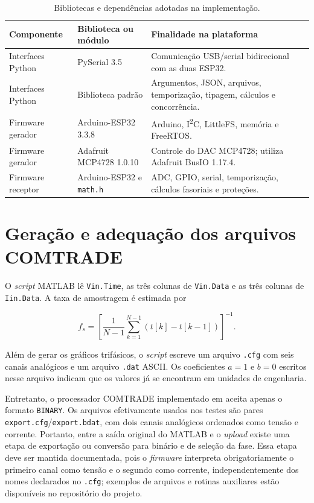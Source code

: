 \begin{table}[H]
  \centering
  \small
  \caption{Bibliotecas e dependências adotadas na implementação.}
  \label{tab:bibliotecas-software}
  \begin{tabular}{p{3.1cm}p{3.5cm}p{6.0cm}}
    \toprule
    Componente & Biblioteca ou módulo & Finalidade na plataforma \\
    \midrule
    Interfaces Python & PySerial 3.5 & Comunicação USB/serial bidirecional com as duas ESP32. \\
    Interfaces Python & Biblioteca padrão & Argumentos, JSON, arquivos, temporização, tipagem, cálculos e concorrência. \\
    Firmware gerador & Arduino-ESP32 3.3.8 & Arduino, I\textsuperscript{2}C, LittleFS, memória e FreeRTOS. \\
    Firmware gerador & Adafruit MCP4728 1.0.10 & Controle do DAC MCP4728; utiliza Adafruit BusIO 1.17.4. \\
    Firmware receptor & Arduino-ESP32 e \texttt{math.h} & ADC, GPIO, serial, temporização, cálculos fasoriais e proteções. \\
    \bottomrule
  \end{tabular}
\end{table}

\section{Geração e adequação dos arquivos COMTRADE}

O \textit{script} MATLAB lê \texttt{Vin.Time}, as três colunas de \texttt{Vin.Data} e as três colunas de \texttt{Iin.Data}. A taxa de amostragem é estimada por

\begin{equation}
  f_s=\left[\frac{1}{N-1}\sum_{k=1}^{N-1}\left(t[k]-t[k-1]\right)\right]^{-1}.
\end{equation}

Além de gerar os gráficos trifásicos, o \textit{script} escreve um arquivo \texttt{.cfg} com seis canais analógicos e um arquivo \texttt{.dat} ASCII. Os coeficientes $a=1$ e $b=0$ escritos nesse arquivo indicam que os valores já se encontram em unidades de engenharia.

Entretanto, o processador COMTRADE implementado em  aceita apenas o formato \texttt{BINARY}. Os arquivos efetivamente usados nos testes são pares \texttt{export.cfg}/\texttt{export.bdat}, com dois canais analógicos ordenados como tensão e corrente. Portanto, entre a saída original do MATLAB e o \textit{upload} existe uma etapa de exportação ou conversão para binário e de seleção da fase. Essa etapa deve ser mantida documentada, pois o \textit{firmware} interpreta obrigatoriamente o primeiro canal como tensão e o segundo como corrente, independentemente dos nomes declarados no \texttt{.cfg}; exemplos de arquivos e rotinas auxiliares estão disponíveis no repositório do projeto.


